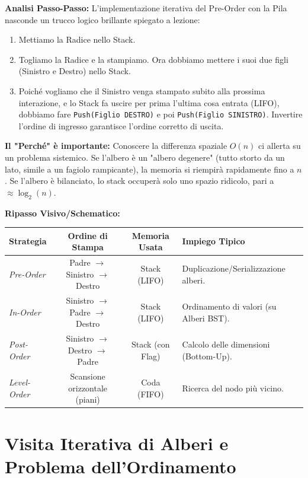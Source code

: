 \documentclass[a4paper, 11pt]{report}
\begin{document}
\textbf{Analisi Passo-Passo:}
L'implementazione iterativa del Pre-Order con la Pila nasconde un trucco logico brillante spiegato a lezione:
\begin{enumerate}
\item Mettiamo la Radice nello Stack.
\item Togliamo la Radice e la stampiamo. Ora dobbiamo mettere i suoi due figli (Sinistro e Destro) nello Stack.
\item Poiché vogliamo che il Sinistro venga stampato subito alla prossima interazione, e lo Stack fa uscire per prima l'ultima cosa entrata (LIFO), dobbiamo fare \texttt{Push(Figlio DESTRO)} e poi \texttt{Push(Figlio SINISTRO)}. Invertire l'ordine di ingresso garantisce l'ordine corretto di uscita.
\end{enumerate}

\textbf{Il "Perché" è importante:}
Conoscere la differenza spaziale $O(n)$ ci allerta su un problema sistemico. Se l'albero è un "albero degenere" (tutto storto da un lato, simile a un fagiolo rampicante), la memoria si riempirà rapidamente fino a $n$. Se l'albero è bilanciato, lo stack occuperà solo uno spazio ridicolo, pari a $\approx \log_2(n)$.

\textbf{Ripasso Visivo/Schematico:}
\begin{center}
\begin{tabular}{|l|c|c|p{5cm}|}
\hline
\textbf{Strategia} & \textbf{Ordine di Stampa} & \textbf{Memoria Usata} & \textbf{Impiego Tipico} \\
\hline
\textit{Pre-Order} & Padre $\rightarrow$ Sinistro $\rightarrow$ Destro & Stack (LIFO) & Duplicazione/Serializzazione alberi. \\
\hline
\textit{In-Order} & Sinistro $\rightarrow$ Padre $\rightarrow$ Destro & Stack (LIFO) & Ordinamento di valori (su Alberi BST). \\
\hline
\textit{Post-Order} & Sinistro $\rightarrow$ Destro $\rightarrow$ Padre & Stack (con Flag) & Calcolo delle dimensioni (Bottom-Up). \\
\hline
\textit{Level-Order} & Scansione orizzontale (piani) & Coda (FIFO) & Ricerca del nodo più vicino. \\
\hline
\end{tabular}
\end{center}
\chapter{Visita Iterativa di Alberi e Problema dell'Ordinamento}
\end{document}
